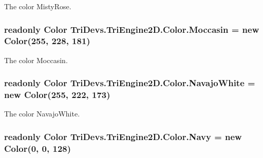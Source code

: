 The color Misty\-Rose. 

\hypertarget{struct_tri_devs_1_1_tri_engine2_d_1_1_color_adad98fb9f15f90dfe940f830cbcb62ca}{
\subsubsection[{Moccasin}]{\setlength{\rightskip}{0pt plus 5cm}readonly {\bf Color} Tri\-Devs.\-Tri\-Engine2\-D.\-Color.\-Moccasin = new {\bf Color}(255, 228, 181)\hspace{0.3cm}{\ttfamily [static]}}}\label{struct_tri_devs_1_1_tri_engine2_d_1_1_color_adad98fb9f15f90dfe940f830cbcb62ca}


The color Moccasin. 

\hypertarget{struct_tri_devs_1_1_tri_engine2_d_1_1_color_a1f9c386ef71feaf0aa8b9f87e3340b1f}{
\subsubsection[{Navajo\-White}]{\setlength{\rightskip}{0pt plus 5cm}readonly {\bf Color} Tri\-Devs.\-Tri\-Engine2\-D.\-Color.\-Navajo\-White = new {\bf Color}(255, 222, 173)\hspace{0.3cm}{\ttfamily [static]}}}\label{struct_tri_devs_1_1_tri_engine2_d_1_1_color_a1f9c386ef71feaf0aa8b9f87e3340b1f}


The color Navajo\-White. 

\hypertarget{struct_tri_devs_1_1_tri_engine2_d_1_1_color_ad24e57370aeb40d47dc504b5a25eb9e7}{
\subsubsection[{Navy}]{\setlength{\rightskip}{0pt plus 5cm}readonly {\bf Color} Tri\-Devs.\-Tri\-Engine2\-D.\-Color.\-Navy = new {\bf Color}(0, 0, 128)\hspace{0.3cm}{\ttfamily [static]}}}\label{struct_tri_devs_1_1_tri_engine2_d_1_1_color_ad24e57370aeb40d47dc504b5a25eb9e7}


